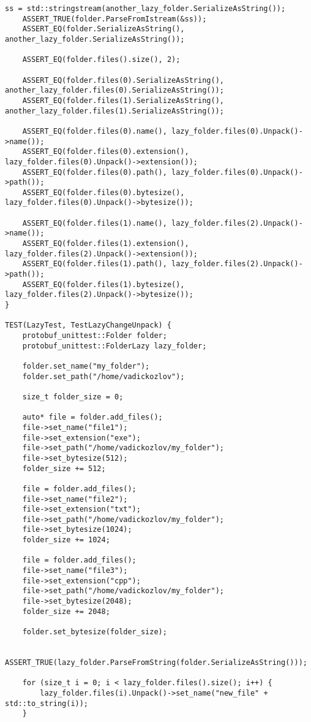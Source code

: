\begin{lstlisting}[style=CodeListing, label=sec_testing:code:tests, caption={Реализация тестов с помощью фреймворка Google Test}]
    ss = std::stringstream(another_lazy_folder.SerializeAsString());
    ASSERT_TRUE(folder.ParseFromIstream(&ss));
    ASSERT_EQ(folder.SerializeAsString(), another_lazy_folder.SerializeAsString());

    ASSERT_EQ(folder.files().size(), 2);

    ASSERT_EQ(folder.files(0).SerializeAsString(), another_lazy_folder.files(0).SerializeAsString());
    ASSERT_EQ(folder.files(1).SerializeAsString(), another_lazy_folder.files(1).SerializeAsString());

    ASSERT_EQ(folder.files(0).name(), lazy_folder.files(0).Unpack()->name());
    ASSERT_EQ(folder.files(0).extension(), lazy_folder.files(0).Unpack()->extension());
    ASSERT_EQ(folder.files(0).path(), lazy_folder.files(0).Unpack()->path());
    ASSERT_EQ(folder.files(0).bytesize(), lazy_folder.files(0).Unpack()->bytesize());

    ASSERT_EQ(folder.files(1).name(), lazy_folder.files(2).Unpack()->name());
    ASSERT_EQ(folder.files(1).extension(), lazy_folder.files(2).Unpack()->extension());
    ASSERT_EQ(folder.files(1).path(), lazy_folder.files(2).Unpack()->path());
    ASSERT_EQ(folder.files(1).bytesize(), lazy_folder.files(2).Unpack()->bytesize());
}

TEST(LazyTest, TestLazyChangeUnpack) {
    protobuf_unittest::Folder folder;
    protobuf_unittest::FolderLazy lazy_folder;

    folder.set_name("my_folder");
    folder.set_path("/home/vadickozlov");

    size_t folder_size = 0;

    auto* file = folder.add_files();
    file->set_name("file1");
    file->set_extension("exe");
    file->set_path("/home/vadickozlov/my_folder");
    file->set_bytesize(512);
    folder_size += 512;

    file = folder.add_files();
    file->set_name("file2");
    file->set_extension("txt");
    file->set_path("/home/vadickozlov/my_folder");
    file->set_bytesize(1024);
    folder_size += 1024;

    file = folder.add_files();
    file->set_name("file3");
    file->set_extension("cpp");
    file->set_path("/home/vadickozlov/my_folder");
    file->set_bytesize(2048);
    folder_size += 2048;

    folder.set_bytesize(folder_size);

    ASSERT_TRUE(lazy_folder.ParseFromString(folder.SerializeAsString()));

    for (size_t i = 0; i < lazy_folder.files().size(); i++) {
        lazy_folder.files(i).Unpack()->set_name("new_file" + std::to_string(i));
    }


\end{lstlisting}
